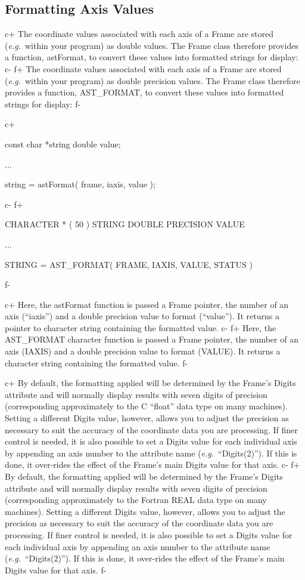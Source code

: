 \documentclass[twoside,11pt]{starlink}
\begin{document}
\subsection{\label{ss:formattingaxisvalues}Formatting Axis Values}

c+
The coordinate values associated with each axis of a Frame are stored
(\emph{e.g.}\ within your program) as double values. The Frame class
therefore provides a function, astFormat, to convert these values into
formatted strings for display:
c-
f+
The coordinate values associated with each axis of a Frame are stored
(\emph{e.g.}\ within your program) as double precision values. The
Frame class therefore provides a function, AST\_FORMAT, to convert
these values into formatted strings for display:
f-

c+
\small
\begin{terminalv}
const char *string
double value;

...

string = astFormat( frame, iaxis, value );
\end{terminalv}
\normalsize
c-
f+
\small
\begin{terminalv}
      CHARACTER * ( 50 ) STRING
      DOUBLE PRECISION VALUE

      ...

      STRING = AST_FORMAT( FRAME, IAXIS, VALUE, STATUS )
\end{terminalv}
\normalsize
f-

c+
Here, the astFormat function is passed a Frame pointer, the number of
an axis (``iaxis'') and a double precision value to format
(``value''). It returns a pointer to character string containing the
formatted value.
c-
f+
Here, the AST\_FORMAT character function is passed a Frame pointer,
the number of an axis (IAXIS) and a double precision value to format
(VALUE). It returns a character string containing the formatted value.
f-
\label{ss:formattingwithdigits}

c+
By default, the formatting applied will be determined by the Frame's
Digits attribute and will normally display results with seven digits
of precision (corresponding approximately to the C ``float'' data type
on many machines). Setting a different Digits value, however, allows
you to adjust the precision as necessary to suit the accuracy of the
coordinate data you are processing.  If finer control is needed, it is
also possible to set a Digits value for each individual axis by
appending an axis number to the attribute name
(\emph{e.g.}\ ``Digits(2)''). If this is done, it over-rides the
effect of the Frame's main Digits value for that axis.
c-
f+
By default, the formatting applied will be determined by the Frame's
Digits attribute and will normally display results with seven digits
of precision (corresponding approximately to the Fortran REAL data
type on many machines). Setting a different Digits value, however,
allows you to adjust the precision as necessary to suit the accuracy
of the coordinate data you are processing.  If finer control is
needed, it is also possible to set a Digits value for each individual
axis by appending an axis number to the attribute name
(\emph{e.g.}\ ``Digits(2)''). If this is done, it over-rides the
effect of the Frame's main Digits value for that axis.
f-
\end{document}
